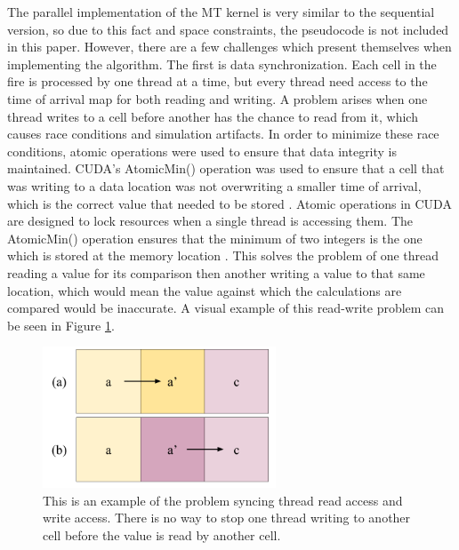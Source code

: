 The parallel implementation of the MT kernel is very similar to the sequential version, so due to this fact and space constraints, the pseudocode is not included in this paper. However, there are a few challenges which present themselves when implementing the algorithm. The first is data synchronization. Each cell in the fire is processed by one thread at a time, but every thread need access to the time of arrival map for both reading and writing. A problem arises when one thread writes to a cell before another has the chance to read from it, which causes race conditions and simulation artifacts. In order to minimize these race conditions, atomic operations were used to ensure that data integrity is maintained. CUDA's AtomicMin() operation was used to ensure that a cell that was writing to a data location was not overwriting a smaller time of arrival, which is the correct value that needed to be stored \cite{cuda}. Atomic operations in CUDA are designed to lock resources when a single thread is accessing them. The AtomicMin() operation ensures that the minimum of two integers is the one which is stored at the memory location \cite{cudabyexample}. This solves the problem of one thread reading a value for its comparison then another writing a value to that same location, which would mean the value against which the calculations are compared would be inaccurate. A visual example of this read-write problem can be seen in Figure \ref{fig:readwrite}. 

\begin{figure}%
\centering
  \includegraphics[height=4.2cm]{figures/implementation/read-write-issue.png}
  \caption{This is an example of the problem syncing thread read access and write access. There is no way to stop one thread writing to another cell before the value is read by another cell.}
  \label{fig:readwrite}
\end{figure}

